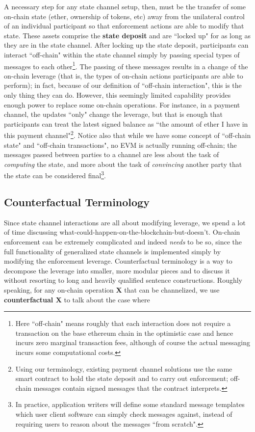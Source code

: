 \documentclass[prb,floatfix,reprint,nofootinbib,amsmath,amssymb,epsfig,pre,floats,letterpaper,groupedaffiliation,tightenlines,allcolors=blue,11pt]{revtex4}
\theoremstyle{definition}
\theoremstyle{definition}
\theoremstyle{definition}
\begin{document}
A necessary step for any state channel setup, then, must be the transfer of some on-chain state (ether, ownership of tokens, etc) away from the unilateral control of an individual participant so that enforcement actions are able to modify that state.  These assets comprise the \textbf{state deposit} and are ``locked up" for as long as they are in the state channel. After locking up the state deposit, participants can interact ``off-chain" within the state channel simply by passing special types of messages to each other\footnote{Here ``off-chain" means roughly that each interaction does not require a transaction on the base ethereum chain in the optimistic case and hence incurs zero marginal transaction fees, although of course the actual messaging incurs some computational costs.}. The passing of these messages results in a change of the on-chain leverage (that is, the types of on-chain actions participants are able to perform); in fact, because of our definition of ``off-chain interaction", this is the only thing they can do.  However, this seemingly limited capability provides enough power to replace some on-chain operations.  For instance, in a payment channel, the updates ``only" change the leverage, but that is enough that participants can treat the latest signed balance as ``the amount of ether I have in this payment channel"\footnote{Using our terminology, existing payment channel solutions use the same smart contract to hold the state deposit and to carry out enforcement; off-chain messages contain signed messages that the contract interprets.}. Notice also that while we have some concept of ``off-chain state" and ``off-chain transactions", no EVM is actually running off-chain; the messages passed between parties to a channel are less about the task of \textit{computing} the state, and more about the task of \textit{convincing} another party that the state can be considered final\footnote{In practice, application writers will define some standard message templates which user client software can simply check messages against, instead of requiring users to reason about the messages ``from scratch".}.

\subsection{Counterfactual Terminology}
\label{sec:cft}

Since state channel interactions are all about modifying leverage, we spend a lot of time discussing what-could-happen-on-the-blockchain-but-doesn't. On-chain enforcement can be extremely complicated and indeed \textit{needs} to be so, since the full functionality of generalized state channels is implemented simply by modifying the enforcement leverage. Counterfactual terminology is a way to decompose the leverage into smaller, more modular pieces and to discuss it without resorting to long and heavily qualified sentence constructions. Roughly speaking, for any on-chain operation \textbf{X} that can be channelized, we use \textbf{counterfactual X} to talk about the case where
\end{document}
